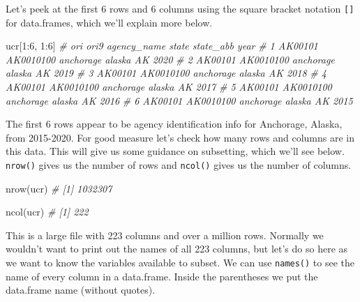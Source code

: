 \documentclass[
  a4paper,
]{krantz}
\makeatletter
\newenvironment{Shaded}{\begin{snugshade}}{\end{snugshade}}
\newcommand{\CommentTok}[1]{\textcolor[rgb]{0.56,0.35,0.01}{\textit{#1}}}
\newcommand{\DecValTok}[1]{\textcolor[rgb]{0.00,0.00,0.81}{#1}}
\newcommand{\FunctionTok}[1]{\textcolor[rgb]{0.00,0.00,0.00}{#1}}
\newcommand{\NormalTok}[1]{#1}
\newcommand{\SpecialCharTok}[1]{\textcolor[rgb]{0.00,0.00,0.00}{#1}}
\newenvironment{kframe}{%
\medskip{}
\setlength{\fboxsep}{.8em}
 \def\at@end@of@kframe{}%
 \ifinner\ifhmode%
  \def\at@end@of@kframe{\end{minipage}}%
  \begin{minipage}{\columnwidth}%
 \fi\fi%
 \def\FrameCommand##1{\hskip\@totalleftmargin \hskip-\fboxsep
 \colorbox{shadecolor}{##1}\hskip-\fboxsep
     \hskip-\linewidth \hskip-\@totalleftmargin \hskip\columnwidth}%
 \MakeFramed {\advance\hsize-\width
   \@totalleftmargin\z@ \linewidth\hsize
   \@setminipage}}%
 {\par\unskip\endMakeFramed%
 \at@end@of@kframe}
\renewenvironment{Shaded}{\begin{kframe}}{\end{kframe}}
\makeatother
\begin{document}
Let's peek at the first 6 rows and 6 columns using the
square bracket notation \texttt{{[}{]}} for data.frames,
which we'll explain more below.

\begin{Shaded}
\begin{Highlighting}[]
\NormalTok{ucr[}\DecValTok{1}\SpecialCharTok{:}\DecValTok{6}\NormalTok{, }\DecValTok{1}\SpecialCharTok{:}\DecValTok{6}\NormalTok{]}
\CommentTok{\#       ori      ori9 agency\_name  state state\_abb year}
\CommentTok{\# 1 AK00101 AK0010100   anchorage alaska        AK 2020}
\CommentTok{\# 2 AK00101 AK0010100   anchorage alaska        AK 2019}
\CommentTok{\# 3 AK00101 AK0010100   anchorage alaska        AK 2018}
\CommentTok{\# 4 AK00101 AK0010100   anchorage alaska        AK 2017}
\CommentTok{\# 5 AK00101 AK0010100   anchorage alaska        AK 2016}
\CommentTok{\# 6 AK00101 AK0010100   anchorage alaska        AK 2015}
\end{Highlighting}
\end{Shaded}

The first 6 rows appear to be agency identification info for
Anchorage, Alaska, from 2015-2020. For good measure let's
check how many rows and columns are in this data. This will
give us some guidance on subsetting, which we'll see below.
\texttt{nrow()} gives us the number of rows and
\texttt{ncol()} gives us the number of columns.

\begin{Shaded}
\begin{Highlighting}[]
\FunctionTok{nrow}\NormalTok{(ucr)}
\CommentTok{\# [1] 1032307}
\end{Highlighting}
\end{Shaded}

\begin{Shaded}
\begin{Highlighting}[]
\FunctionTok{ncol}\NormalTok{(ucr)}
\CommentTok{\# [1] 222}
\end{Highlighting}
\end{Shaded}

This is a large file with 223 columns and over a million
rows. Normally we wouldn't want to print out the names of
all 223 columns, but let's do so here as we want to know the
variables available to subset. We can use \texttt{names()}
to see the name of every column in a data.frame. Inside the
parentheses we put the data.frame name (without quotes).
\end{document}

